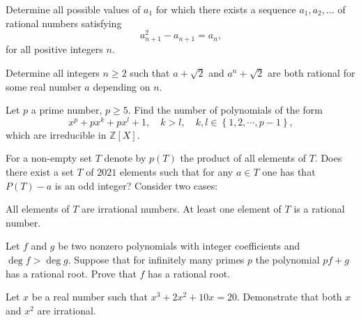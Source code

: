 \documentclass[12pt,a4paper]{memoir}
\theoremstyle{definition}
\begin{document}
\begin{question}[name={2022 Thailand}]
	Determine all possible values of $a_1$ for which there exists a sequence $a_1, a_2, \dots$ of rational numbers satisfying $$a_{n+1}^2-a_{n+1}=a_n,$$ for all positive integers $n$.
\end{question}


\begin{question}[name={2017 Romania TST}]
	Determine all integers $n\geq 2$ such that $a+\sqrt{2}$ and $a^n+\sqrt{2}$ are both rational for some real number $a$ depending on $n$.
\end{question}

\begin{question}[name={2006 Romania TST}]
	Let $p$ a prime number, $p\geq 5$. Find the number of polynomials of the form
	\[ x^p + px^k + p x^l + 1, \quad k > l, \quad k, l \in \left\{1,2,\cdots,p-1\right\},\] which are irreducible in $\mathbb{Z}[X]$.
\end{question}


\begin{question}[name={2021 Saudi Arabia TST}]
	For a non-empty set $T$ denote by $p(T)$ the product of all elements of $T$. Does there exist a set $T$ of $2021$ elements such that for any $a\in T$ one has that $P(T)-a$ is an odd integer? Consider two cases:
	\begin{tasks}
		\task All elements of $T$ are irrational numbers.
		\task At least one element of $T$ is a rational number.
	\end{tasks}
\end{question}

\begin{question}[name={2012 IMO Shortlist}]
	Let $f$ and $g$ be two nonzero polynomials with integer coefficients and $\deg f>\deg g$. Suppose that for infinitely many primes $p$ the polynomial $pf+g$ has a rational root. Prove that $f$ has a rational root.
\end{question}

\begin{question}[name={2003 Spain}]
	Let ${x}$ be a real number such that ${x^3 + 2x^2 + 10x = 20.}$ Demonstrate that both ${x}$ and ${x^2}$ are irrational.
\end{question}
\end{document}
